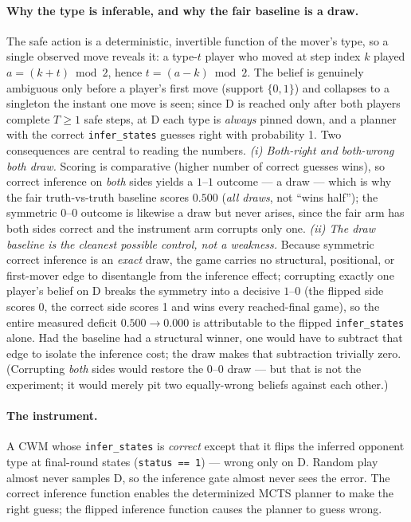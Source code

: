 \documentclass[11pt]{article}
\theoremstyle{remark}
\begin{document}
\paragraph{Why the type is inferable, and why the fair baseline is a draw.} The safe action is a deterministic, invertible function of the mover's type, so a single observed move reveals it: a type-$t$ player who moved at step index $k$ played $a = (k + t) \bmod 2$, hence $t = (a - k) \bmod 2$. The belief is genuinely ambiguous only before a player's first move (support $\{0,1\}$) and collapses to a singleton the instant one move is seen; since D is reached only after both players complete $T \ge 1$ safe steps, at D each type is \emph{always} pinned down, and a planner with the correct \texttt{infer\_states} guesses right with probability 1. Two consequences are central to reading the numbers. \emph{(i) Both-right and both-wrong both draw.} Scoring is comparative (higher number of correct guesses wins), so correct inference on \emph{both} sides yields a $1$--$1$ outcome --- a draw --- which is why the fair truth-vs-truth baseline scores $0.500$ (\emph{all draws}, not ``wins half''); the symmetric $0$--$0$ outcome is likewise a draw but never arises, since the fair arm has both sides correct and the instrument arm corrupts only one. \emph{(ii) The draw baseline is the cleanest possible control, not a weakness.} Because symmetric correct inference is an \emph{exact} draw, the game carries no structural, positional, or first-mover edge to disentangle from the inference effect; corrupting exactly one player's belief on D breaks the symmetry into a decisive $1$--$0$ (the flipped side scores 0, the correct side scores 1 and wins every reached-final game), so the entire measured deficit $0.500 \to 0.000$ is attributable to the flipped \texttt{infer\_states} alone. Had the baseline had a structural winner, one would have to subtract that edge to isolate the inference cost; the draw makes that subtraction trivially zero. (Corrupting \emph{both} sides would restore the $0$--$0$ draw --- but that is not the experiment; it would merely pit two equally-wrong beliefs against each other.)

\paragraph{The instrument.} A CWM whose \texttt{infer\_states} is \emph{correct} except that it flips the inferred opponent type at final-round states (\texttt{status == 1}) --- wrong only on D. Random play almost never samples D, so the inference gate almost never sees the error. The correct inference function enables the determinized MCTS planner to make the right guess; the flipped inference function causes the planner to guess wrong.
\end{document}
